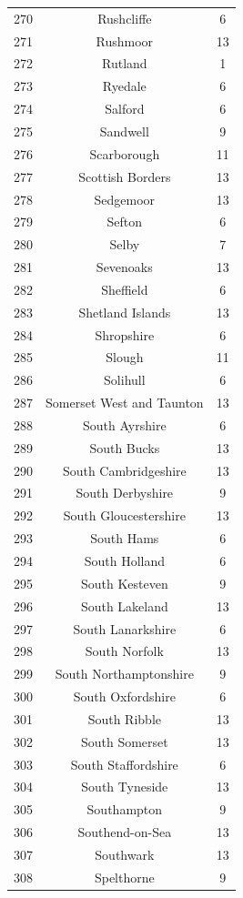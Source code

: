\documentclass[Royal,times,sageh]{sagej}
\begin{document}
\begin{table}[!htbp]
\begin{tabular}{@{\extracolsep{5pt}} ccc}
270 & Rushcliffe & 6 \\ 
271 & Rushmoor & 13 \\ 
272 & Rutland & 1 \\ 
273 & Ryedale & 6 \\ 
274 & Salford & 6 \\ 
275 & Sandwell & 9 \\ 
276 & Scarborough & 11 \\ 
277 & Scottish Borders & 13 \\ 
278 & Sedgemoor & 13 \\ 
279 & Sefton & 6 \\ 
280 & Selby & 7 \\ 
281 & Sevenoaks & 13 \\ 
282 & Sheffield & 6 \\ 
283 & Shetland Islands & 13 \\ 
284 & Shropshire & 6 \\ 
285 & Slough & 11 \\ 
286 & Solihull & 6 \\ 
287 & Somerset West and Taunton & 13 \\ 
288 & South Ayrshire & 6 \\ 
289 & South Bucks & 13 \\ 
290 & South Cambridgeshire & 13 \\ 
291 & South Derbyshire & 9 \\ 
292 & South Gloucestershire & 13 \\ 
293 & South Hams & 6 \\ 
294 & South Holland & 6 \\ 
295 & South Kesteven & 9 \\ 
296 & South Lakeland & 13 \\ 
297 & South Lanarkshire & 6 \\ 
298 & South Norfolk & 13 \\ 
299 & South Northamptonshire & 9 \\ 
300 & South Oxfordshire & 6 \\ 
301 & South Ribble & 13 \\ 
302 & South Somerset & 13 \\ 
303 & South Staffordshire & 6 \\ 
304 & South Tyneside & 13 \\ 
305 & Southampton & 9 \\ 
306 & Southend-on-Sea & 13 \\ 
307 & Southwark & 13 \\ 
308 & Spelthorne & 9 \\ 

\end{tabular}
\end{table}
\end{document}
